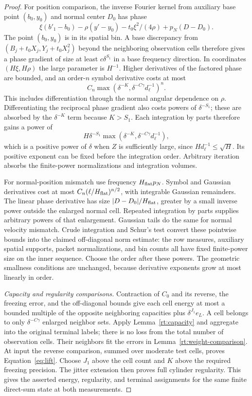 \begin{proof}
For position comparison, the inverse Fourier kernel from auxiliary
base point $(b_0,y_0)$ and normal center $D_0$ has phase
\[
 \xi(b'_1-b_0)-\rho(y'-y_0)
       -t_0\xi^2/(4\rho)+p_N(D-D_0).
\]
The point $(b_0,y_0)$ is in its spatial bin.  A base discrepancy from
$(B_j+t_0X_j,Y_j+t_0X_j^2)$ beyond the neighboring observation cells
therefore gives a phase gradient of size at least $c\delta^{S_1}$
in a base frequency direction.  In coordinates $(H\xi,H\rho)$ the
large parameter is $H^{-1}$.  Higher derivatives of the factored
phase are bounded, and an order-$n$ symbol derivative costs at most
\[
 C_n\max(\delta^{-K},\delta^{-C\gamma}d_\ell^{-1})^n.
\]
This includes differentiation through the normal angular dependence
on $\rho$.  Differentiating the reciprocal phase gradient also costs
powers of $\delta^{-S_1}$; these are absorbed by the
$\delta^{-K}$ term because $K>S_1$.  Each integration by parts
therefore gains a power of
\[
 H\delta^{-S_1}\max(\delta^{-K},\delta^{-C\gamma}d_\ell^{-1}),
\]
which is a positive power of $\delta$ when $Z$ is sufficiently large,
since $Hd_\ell^{-1}\le\sqrt H$.  Its positive exponent can be fixed
before the integration order.  Arbitrary iteration absorbs the
finite-power normalizations and integration volumes.

For normal-position mismatch use frequency $H_{\rm flat}p_N$.
Symbol and Gaussian derivatives cost at most
$C_n(\ell/H_{\rm flat})^{n/2}$, with integrable Gaussian remainders.
The linear phase derivative has size
$|D-D_0|/H_{\rm flat}$, greater by a small inverse power outside the
enlarged normal cell.  Repeated integration by parts supplies arbitrary
powers of that enlargement.  Gaussian tails do the same for normal
velocity mismatch.  Crude integration and Schur's test convert these
pointwise bounds into the claimed off-diagonal norm estimate: the row
measures, auxiliary spatial supports, packet normalizations, and bin
counts all have fixed finite-power size on the inner sequence.  Choose
the order after these powers.  The geometric smallness conditions are
unchanged, because derivative exponents grow at most linearly in order.

\smallskip\noindent
\emph{Capacity and regularity comparisons.}
Contraction of $C_0$ and its reverse, the freezing error, and
the off-diagonal bounds give each cell energy at most a bounded
multiple of the opposite neighboring capacities plus
$\delta^{J_1}e_L$.  A cell belongs to only
$\delta^{-C\gamma}$ enlarged neighbor sets.  Apply
Lemma~\ref{rt:capacity} and aggregate into the original terminal labels;
there is no loss from the total number of observation cells.
Their neighbors fit the errors in Lemma~\ref{rt:weight-comparison}.
At input the reverse comparison, summed over moderate test cells,
proves Equation~\eqref{eq:lift}.  Choose $J_1$ above the cell count
and $K$ above the required freezing precision.  The jitter extension
then proves full cylinder regularity.  This gives the asserted energy,
regularity, and terminal assignments for the same finite direct-sum
state at both measurements.
\end{proof}


